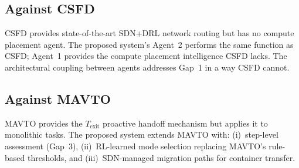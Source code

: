 \documentclass[12pt,a4paper]{article}
\begin{document}
\subsection{Against CSFD \cite{csfd2025}}

CSFD provides state-of-the-art SDN+DRL network routing but has no compute
placement agent. The proposed system's Agent~2 performs the same function as
CSFD; Agent~1 provides the compute placement intelligence CSFD lacks. The
architectural coupling between agents addresses Gap~1 in a way CSFD cannot.

\subsection{Against MAVTO \cite{mavto2024}}

MAVTO provides the $T_{\text{exit}}$ proactive handoff mechanism but applies it
to monolithic tasks. The proposed system extends MAVTO with: (i)~step-level
assessment (Gap~3), (ii)~RL-learned mode selection replacing MAVTO's rule-based
thresholds, and (iii)~SDN-managed migration paths for container transfer.



\end{document}
